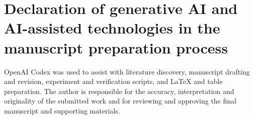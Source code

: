 \documentclass[preprint,review,12pt]{elsarticle}
\begin{document}
\section*{Declaration of generative AI and AI-assisted technologies in the manuscript preparation process}
OpenAI Codex was used to assist with literature discovery, manuscript drafting and revision, experiment and verification scripts, and LaTeX and table preparation. The author is responsible for the accuracy, interpretation and originality of the submitted work and for reviewing and approving the final manuscript and supporting materials.



\end{document}
